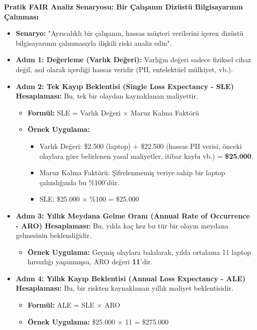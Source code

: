 \textbf{Pratik FAIR Analiz Senaryosu: Bir Çalışanın Dizüstü Bilgisayarının Çalınması}

\begin{itemize}
    \item \textbf{Senaryo:} "Ayrıcalıklı bir çalışanın, hassas müşteri verilerini içeren dizüstü bilgisayarının çalınmasıyla ilişkili riski analiz edin".
    \item \textbf{Adım 1: Değerleme (Varlık Değeri):} Varlığın değeri sadece fiziksel cihaz değil, asıl olarak içerdiği hassas veridir (PII, entelektüel mülkiyet, vb.).
    \item \textbf{Adım 2: Tek Kayıp Beklentisi (Single Loss Expectancy - SLE) Hesaplaması:} Bu, tek bir olaydan kaynaklanan maliyettir.
    \begin{itemize}
        \item \textbf{Formül:} SLE = Varlık Değeri $\times$ Maruz Kalma Faktörü
        \item \textbf{Örnek Uygulama:}
        \begin{itemize}
            \item Varlık Değeri: \$2.500 (laptop) + \$22.500 (hassas PII verisi, önceki olaylara göre belirlenen yasal maliyetler, itibar kaybı vb.) = \textbf{\$25.000}.
            \item Maruz Kalma Faktörü: Şifrelenmemiş veriye sahip bir laptop çalındığında bu \%100'dür.
            \item SLE: \$25.000 $\times$ \%100 = \$25.000
        \end{itemize}
    \end{itemize}
    \item \textbf{Adım 3: Yıllık Meydana Gelme Oranı (Annual Rate of Occurrence - ARO) Hesaplaması:} Bu, yılda kaç kez bu tür bir olayın meydana gelmesinin beklendiğidir.
    \begin{itemize}
        \item \textbf{Örnek Uygulama:} Geçmiş olaylara bakılarak, yılda ortalama 11 laptop hırsızlığı yaşanmışsa, ARO değeri \textbf{11}'dir.
    \end{itemize}
    \item \textbf{Adım 4: Yıllık Kayıp Beklentisi (Annual Loss Expectancy - ALE) Hesaplaması:} Bu, bir riskten kaynaklanan yıllık maliyet beklentisidir.
    \begin{itemize}
        \item \textbf{Formül:} ALE = SLE $\times$ ARO
        \item \textbf{Örnek Uygulama:} \$25.000 $\times$ 11 = \$275.000
    \end{itemize}
\end{itemize}

